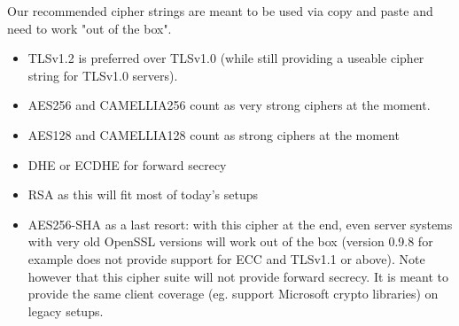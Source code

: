 Our recommended cipher strings are meant to be used via copy and paste and need to work
"out of the box".

\begin{itemize}
  \item TLSv1.2 is preferred over TLSv1.0 (while still providing a useable cipher
      string for TLSv1.0 servers).
  \item AES256 and CAMELLIA256 count as very strong ciphers at the moment.
  \item AES128 and CAMELLIA128 count as strong ciphers at the moment
  \item DHE or ECDHE for forward secrecy
  \item RSA as this will fit most of today's setups
  \item AES256-SHA as a last resort: with this cipher at the end, even server
      systems with very old OpenSSL versions will work out of the box (version 0.9.8 for example does not
      provide support for ECC and TLSv1.1 or above). \newline
      Note however that this cipher suite will not provide forward secrecy. It
      is meant to provide the same client coverage (eg. support Microsoft crypto
      libraries) on legacy setups.
\end{itemize}
